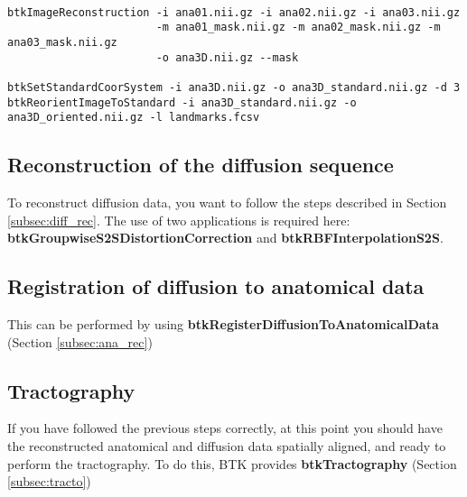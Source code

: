\begin{verbatim}
 
btkImageReconstruction -i ana01.nii.gz -i ana02.nii.gz -i ana03.nii.gz 
                       -m ana01_mask.nii.gz -m ana02_mask.nii.gz -m ana03_mask.nii.gz
                       -o ana3D.nii.gz --mask

btkSetStandardCoorSystem -i ana3D.nii.gz -o ana3D_standard.nii.gz -d 3
btkReorientImageToStandard -i ana3D_standard.nii.gz -o ana3D_oriented.nii.gz -l landmarks.fcsv

\end{verbatim}



\subsection{Reconstruction of the diffusion sequence}
To reconstruct diffusion data, you want to follow the steps described in
Section \ref{subsec:diff_rec}. The use of two applications is required here:
\textbf{btkGroupwiseS2SDistortionCorrection} and
\textbf{btkRBFInterpolationS2S}.

\subsection{Registration of diffusion to anatomical data}
This can be performed by using \textbf{btkRegisterDiffusionToAnatomicalData}
(Section \ref{subsec:ana_rec})

\subsection{Tractography}
If you have followed the previous steps correctly, at this point you should
have the reconstructed anatomical and diffusion data spatially aligned, and
ready to perform the tractography. To do this, BTK provides
\textbf{btkTractography} (Section \ref{subsec:tracto})

